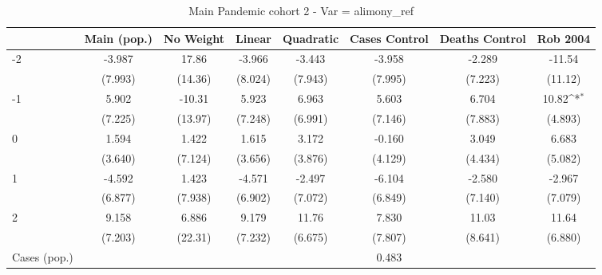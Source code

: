\documentclass{article}
\begin{document}
{
\def\sym#1{\ifmmode^{#1}\else\(^{#1}\)\fi}
\begin{longtable}{l*{7}{c}}
\caption{Main Pandemic cohort 2 - Var = alimony\_ref}\\
\hline\hline\endfirsthead\hline\endhead\hline\endfoot\endlastfoot
                &\multicolumn{1}{c}{Main (pop.)}&\multicolumn{1}{c}{No Weight}&\multicolumn{1}{c}{Linear}&\multicolumn{1}{c}{Quadratic}&\multicolumn{1}{c}{Cases Control}&\multicolumn{1}{c}{Deaths Control}&\multicolumn{1}{c}{Rob 2004}\\
\hline
-2              &   -3.987         &    17.86         &   -3.966         &   -3.443         &   -3.958         &   -2.289         &   -11.54         \\
                &  (7.993)         &  (14.36)         &  (8.024)         &  (7.943)         &  (7.995)         &  (7.223)         &  (11.12)         \\
-1              &    5.902         &   -10.31         &    5.923         &    6.963         &    5.603         &    6.704         &    10.82\sym{*}  \\
                &  (7.225)         &  (13.97)         &  (7.248)         &  (6.991)         &  (7.146)         &  (7.883)         &  (4.893)         \\
0               &    1.594         &    1.422         &    1.615         &    3.172         &   -0.160         &    3.049         &    6.683         \\
                &  (3.640)         &  (7.124)         &  (3.656)         &  (3.876)         &  (4.129)         &  (4.434)         &  (5.082)         \\
1               &   -4.592         &    1.423         &   -4.571         &   -2.497         &   -6.104         &   -2.580         &   -2.967         \\
                &  (6.877)         &  (7.938)         &  (6.902)         &  (7.072)         &  (6.849)         &  (7.140)         &  (7.079)         \\
2               &    9.158         &    6.886         &    9.179         &    11.76         &    7.830         &    11.03         &    11.64         \\
                &  (7.203)         &  (22.31)         &  (7.232)         &  (6.675)         &  (7.807)         &  (8.641)         &  (6.880)         \\
Cases (pop.)    &                  &                  &                  &                  &    0.483         &                  &                  \\

\end{longtable}}
\end{document}

